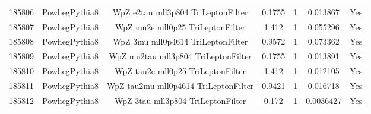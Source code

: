\begin{table}[ht!]
\begin{footnotesize}
\begin{tabular}{c|c|c|c|c|c|c}
185806  &  PowhegPythia8 &  WpZ e2tau mll3p804 TriLeptonFilter  &  0.1755  &  1  &  0.013867 & Yes  \\
185807  &  PowhegPythia8 &  WpZ mu2e mll0p25 TriLeptonFilter  &  1.412  &  1  &  0.055296 & Yes  \\
185808  &  PowhegPythia8 &  WpZ 3mu mll0p4614 TriLeptonFilter  &  0.9572  &  1  &  0.073362 & Yes  \\
185809  &  PowhegPythia8 &  WpZ mu2tau mll3p804 TriLeptonFilter  &  0.1755  &  1  &  0.013891 & Yes \\
185810  &  PowhegPythia8 &  WpZ tau2e mll0p25 TriLeptonFilter  &  1.412  &  1  &  0.012105 & Yes  \\
185811  &  PowhegPythia8 &  WpZ tau2mu mll0p4614 TriLeptonFilter  &  0.9421  &  1  &  0.016718 & Yes  \\
185812  &  PowhegPythia8 &  WpZ 3tau mll3p804 TriLeptonFilter  &  0.172  &  1  &  0.0036427 & Yes  \\

\end{tabular}
\end{footnotesize}
\end{table}
